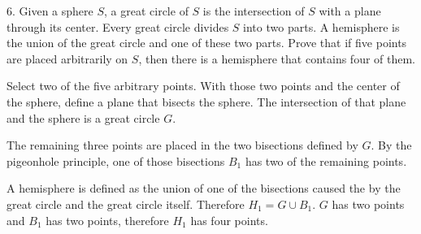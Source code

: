 \documentclass{article}
\begin{document}
\begin{exercise}{}{}
	{6. Given a sphere $S$, a great circle of $S$ is the
		intersection of $S$ with a plane through its center. Every great circle
		divides $S$ into two parts. A hemisphere is the union of the great circle and
		one of these two parts. Prove that if five points are placed arbitrarily on $S$,
		then there is a hemisphere that contains four of them.}
	\begin{alist}
		\item Select two of the five arbitrary points. With those two points and the
		center of the sphere, define a plane that bisects the sphere. The
		intersection of that plane and the sphere is a great circle $G$.
		\item The remaining three points are placed in the two bisections defined by
		$G$. By the pigeonhole principle, one of those bisections $B_1$ has two of
		the remaining points.
		\item A hemisphere is defined as the union of one of the bisections caused the
		by the great circle and the great circle itself. Therefore $H_1 = G \cup B_1$. $G$ has two points and
		$B_1$ has two points, therefore $H_1$ has four points.
	\end{alist}
\end{exercise}{}{}
\end{document}
